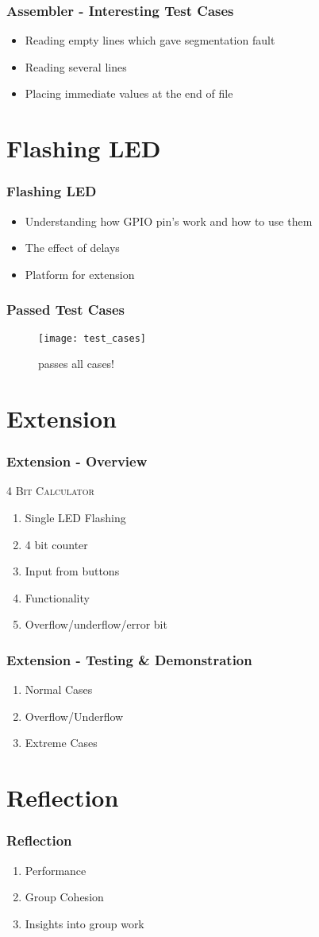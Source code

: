 \documentclass[12pt]{beamer}
\begin{document}
\begin{frame}
\frametitle{Assembler - Interesting Test Cases}
\begin{itemize}
\item Reading empty lines which gave segmentation fault
\item Reading several lines
\item Placing immediate values at the end of file
\end{itemize}
\end{frame}


\section{Flashing LED}
\begin{frame}
\frametitle{Flashing LED}
\begin{itemize}
\item Understanding how GPIO pin's work and how to use them
\item The effect of delays
\item Platform for extension
\end{itemize}
\end{frame}

\begin{frame}
\frametitle{Passed Test Cases}
\begin{figure}
\texttt{[image: test\_cases]}
\caption{passes all cases!}
\end{figure}
\end{frame}


\section{Extension}
\begin{frame}
\frametitle{Extension - Overview}
\textsc{4 Bit Calculator}
\begin{enumerate}
\item Single LED Flashing
\item 4 bit counter 
\item Input from buttons
\item Functionality
\item Overflow/underflow/error bit
\end{enumerate}
\end{frame}


\begin{frame}
\frametitle{Extension - Testing \& Demonstration}
\begin{enumerate}
\item Normal Cases
\item Overflow/Underflow
\item Extreme Cases
\end{enumerate}
\end{frame}


\section{Reflection}
\begin{frame}
\frametitle{Reflection}
\begin{enumerate}
\item Performance 
\item Group Cohesion 
\item Insights into group work 
\end{enumerate}
\end{frame}
\end{document}
